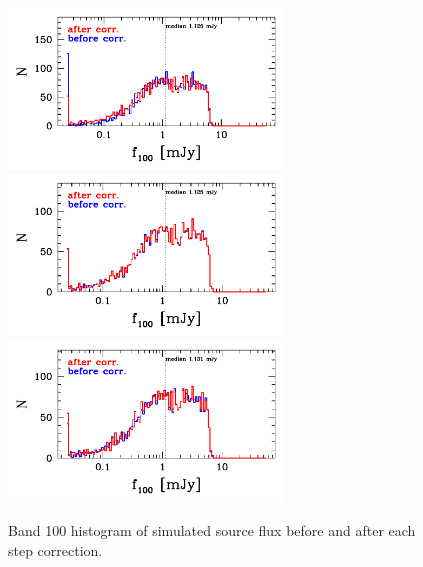 \documentclass[11pt,a4paper]{article}
\begin{document}
\begin{figure}[H]
	\caption{
		Band 100 histogram of simulated source flux before and after each step correction. 
	}
	\includegraphics[width=0.65\textwidth]{galsim_100_hist_flux_1}
	\includegraphics[width=0.65\textwidth]{galsim_100_hist_flux_2}
	\includegraphics[width=0.65\textwidth]{galsim_100_hist_flux_3}
\end{figure}
\end{document}
